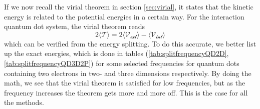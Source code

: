 If we now recall the virial theorem in section \ref{sec:virial}, it states that the kinetic energy is related to the potential energies in a certain way. For the interaction quantum dot system, the virial theorem reads
\begin{equation}
2\langle \mathcal{T} \rangle=2\langle \mathcal{V_{\text{ext}}} \rangle-\langle \mathcal{V_{\text{int}}} \rangle
\end{equation}
which can be verified from the energy splitting. To do this accurate, we better list up the exact energies, which is done in tables (\ref{tab:splitfrequencyQD2D},\ref{tab:splitfrequencyQD3D2P}) for some selected frequencies for quantum dots containing two electrons in two- and three dimensions respectively. By doing the math, we see that the virial theorem is satisfied for low frequencies, but as the frequency increases the theorem gets more and more off. This is the case for all the methods.

